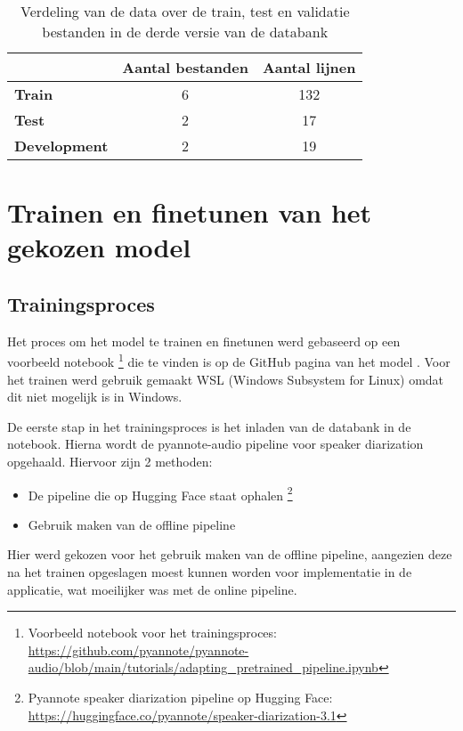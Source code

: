 \begin{table}[]
    \begin{tabular}{@{}lcc@{}}
        \toprule
        & \multicolumn{1}{l}{\textbf{Aantal bestanden}} & \multicolumn{1}{l}{\textbf{Aantal lijnen}} \\ \midrule
        \textbf{Train}       & 6                                             & 132                                        \\
        \textbf{Test}        & 2                                             & 17                                         \\
        \textbf{Development} & 2                                             & 19                                         \\ \bottomrule
    \end{tabular}
    \caption[Verdeling data tweede versie databank]{\label{tbl:verdeling-v3}Verdeling van de data over de train, test en validatie bestanden in de derde versie van de databank}
\end{table}

\section{Trainen en finetunen van het gekozen model}
\label{sec:trainen}

\subsection{Trainingsproces}
\label{subsec:proces}
Het proces om het model te trainen en finetunen werd gebaseerd op een voorbeeld notebook \footnote{Voorbeeld notebook voor het trainingsproces: \url{https://github.com/pyannote/pyannote-audio/blob/main/tutorials/adapting_pretrained_pipeline.ipynb}} die te vinden is op de GitHub pagina van het model \autocite{Bredin2024}. Voor het trainen werd gebruik gemaakt WSL (Windows Subsystem for Linux) omdat dit niet mogelijk is in Windows.

De eerste stap in het trainingsproces is het inladen van de databank in de notebook. Hierna wordt de pyannote-audio pipeline voor speaker diarization opgehaald. Hiervoor zijn 2 methoden:
\begin{itemize}
	\item De pipeline die op Hugging Face staat ophalen \footnote{Pyannote speaker diarization pipeline op Hugging Face: \url{https://huggingface.co/pyannote/speaker-diarization-3.1}}
	\item Gebruik maken van de offline pipeline
\end{itemize}
Hier werd gekozen voor het gebruik maken van de offline pipeline, aangezien deze na het trainen opgeslagen moest kunnen worden voor implementatie in de applicatie, wat moeilijker was met de online pipeline.

